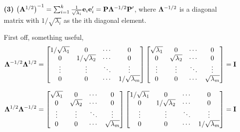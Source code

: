 \begin{enumerate}
            \item[\textbf{(3)}]{${\left(\bold{A}^{1/2}\right)}^{-1} = \sum_{i=1}^k{\frac{1}{\sqrt{\lambda_i}}\bold{e}_i\bold{e}_i^\prime} = \bold{P}\bold{\Lambda}^{-1/2}\bold{P}^\prime$, where $\bold{\Lambda}^{-1/2}$ is a diagonal matrix with $1/\sqrt{\lambda_i}$ as the ith diagonal element.}
            \newline
            \par
            First off, something useful,            
            \[
                \bold{\Lambda}^{-1/2}\bold{\Lambda}^{1/2}
                =
                \begin{bmatrix}
                    1/\sqrt{\lambda_1} & 0 & \cdots & 0 \\
                    0 & 1/\sqrt{\lambda_2} & \cdots & 0 \\
                    \vdots & \vdots & \ddots & \vdots \\
                    0 & 0 & \cdots & 1/\sqrt{\lambda_m}
                \end{bmatrix}
                \begin{bmatrix}
                    \sqrt{\lambda_1} & 0 & \cdots & 0 \\
                    0 & \sqrt{\lambda_2} & \cdots & 0 \\
                    \vdots & \vdots & \ddots & \vdots \\
                    0 & 0 & \cdots & \sqrt{\lambda_m}
                \end{bmatrix}
                =
                \bold{I}
            \]

            \[
                \bold{\Lambda}^{1/2}\bold{\Lambda}^{-1/2}
                =
                \begin{bmatrix}
                    \sqrt{\lambda_1} & 0 & \cdots & 0 \\
                    0 & \sqrt{\lambda_2} & \cdots & 0 \\
                    \vdots & \vdots & \ddots & \vdots \\
                    0 & 0 & \cdots & \sqrt{\lambda_m}
                \end{bmatrix}
                \begin{bmatrix}
                    1/\sqrt{\lambda_1} & 0 & \cdots & 0 \\
                    0 & 1/\sqrt{\lambda_2} & \cdots & 0 \\
                    \vdots & \vdots & \ddots & \vdots \\
                    0 & 0 & \cdots & 1/\sqrt{\lambda_m}
                \end{bmatrix}
                =
                \bold{I}
            \]


\end{enumerate}
